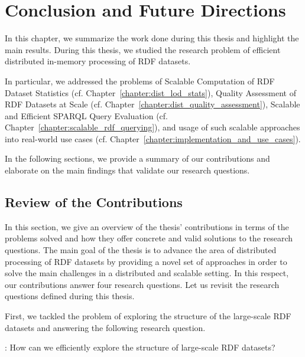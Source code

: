 \chapter{Conclusion and Future Directions}
\label{chapter:conclusion}

In this chapter, we summarize the work done during this thesis and highlight the main results.
During this thesis, we studied the research problem of efficient distributed in-memory processing of \gls{RDF} datasets.

In particular, we addressed the problems of Scalable Computation of \gls{RDF} Dataset Statistics (cf. Chapter~\ref{chapter:dist_lod_stats}), Quality Assessment of \gls{RDF} Datasets at Scale (cf. Chapter~\ref{chapter:dist_quality_assessment}), Scalable and Efficient \gls{SPARQL} Query Evaluation (cf. Chapter~\ref{chapter:scalable_rdf_querying}), and usage of such scalable approaches into real-world use cases (cf. Chapter~\ref{chapter:implementation_and_use_cases}).

In the following sections, we provide a summary of our contributions and elaborate on the main findings that validate our research questions.

\section{Review of the Contributions}
In this section, we give an overview of the thesis' contributions in terms of the problems solved and how they offer concrete and valid solutions to the research questions.
The main goal of the thesis is to advance the area of distributed processing of \gls{RDF} datasets by providing a novel set of approaches in order to solve the main challenges in a distributed and scalable setting.
In this respect, our contributions answer four research questions.
Let us revisit the research questions defined during this thesis.

First, we tackled the problem of exploring the structure of the large-scale \gls{RDF} datasets and answering the following research question.

\begin{tcolorbox}
\textbf{\rqNr[RQ1]\label{rqc:1}}: How can we efficiently explore the structure of large-scale \gls{RDF} datasets?
\end{tcolorbox}

